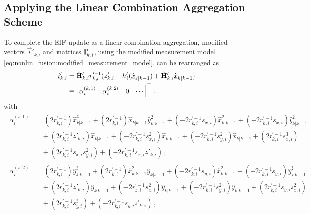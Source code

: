 \subsection{Applying the Linear Combination Aggregation Scheme}\label{subsec:nonlin_fusion:applying_lca_scheme}
To complete the EIF update as a linear combination aggregation, modified vectors $\vec{i}'_{k, i}$ and matrices ${{\mathbf{I}}}'_{k, i}$, using the modified measurement model \eqref{eq:nonlin_fusion:modified_measurement_model}, can be rearranged as
\begin{equation}\label{eq:nonlin_fusion:hrz_linear_comb}
    \begin{split}
        {\underline{i}}'_{k,i} &= \hat{{{\mathbf{H}}}}_{k,i}^{\prime\top} r_{k,i}^{\prime-1}(z'_{k,i} - h'_i(\hat{{\underline{x}}}_{k|k-1}) + \hat{{{\mathbf{H}}}}'_{k,i}\hat{{\underline{x}}}_{k|k-1}) \\
        &= 
        \begin{bmatrix}
            \alpha_i^{(k,1)} & \alpha_i^{(k,2)} & 0 & \cdots
        \end{bmatrix}^\top\,,
    \end{split}
\end{equation}
with
\begin{align*}
    \begin{split}
        \alpha_i^{(k,1)} &= (2r_{k,i}^{\prime-1})\hat{x}_{k|k-1}^3 + (2r_{k,i}^{\prime-1})\hat{x}_{k|k-1}\hat{y}_{k|k-1}^2+ (-2r_{k,i}^{\prime-1}s_{x,i})\hat{x}_{k|k-1}^2 + (-2r_{k,i}^{\prime-1}s_{x,i})\hat{y}_{k|k-1}^2 \\
        &\quad+ (2r_{k,i}^{\prime-1}z'_{k,i})\hat{x}_{k|k-1} + (-2r_{k,i}^{\prime-1}s_{x,i}^2)\hat{x}_{k|k-1}+ (-2r_{k,i}^{\prime-1}s_{y,i}^2)\hat{x}_{k|k-1} + (2r_{k,i}^{\prime-1}s_{x,i}^3) \\
        &\quad+ (2r_{k,i}^{\prime-1}s_{x,i}s_{y,i}^2) + (-2r_{k,i}^{\prime-1}s_{x,i} z'_{k,i})\,,
    \end{split}\\
    \begin{split}
        \alpha_i^{(k,2)} &= (2r_{k,i}^{\prime-1})\hat{y}_{k|k-1}^3 + (2r_{k,i}^{\prime-1})\hat{x}_{k|k-1}^2\hat{y}_{k|k-1}+ (-2r_{k,i}^{\prime-1}s_{y,i})\hat{x}_{k|k-1}^2 + (-2r_{k,i}^{\prime-1}s_{y,i})\hat{y}_{k|k-1}^2 \\
        &\quad+ (2r_{k,i}^{\prime-1}z'_{k,i})\hat{y}_{k|k-1} + (-2r_{k,i}^{\prime-1}s_{x,i}^2)\hat{y}_{k|k-1}+ (-2r_{k,i}^{\prime-1}s_{y,i}^2)\hat{y}_{k|k-1} + (2r_{k,i}^{\prime-1}s_{y,i}s_{x,i}^2) \\
        &\quad+ (2r_{k,i}^{\prime-1}s_{y,i}^3) + (-2r_{k,i}^{\prime-1}s_{y,i}z'_{k,i})\,,
    \end{split}
\end{align*}

